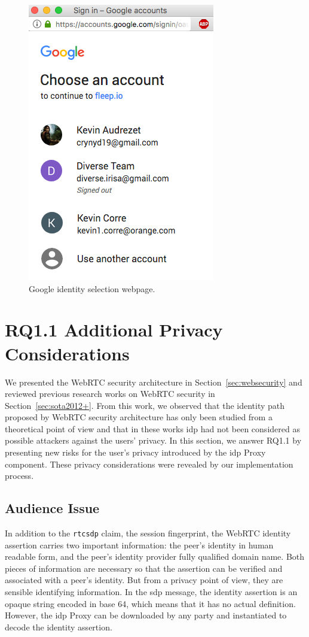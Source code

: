 \begin{figure}[h]
\includegraphics[width=1.3\marginparwidth]{images/googleIdSelector}
\caption[Google Identity Selection Page]{Google identity selection webpage.}
\label{fig:googleIdSelector}
\end{figure}

\section{RQ1.1 Additional Privacy Considerations}
\label{sec:privacyissue}

We presented the WebRTC security architecture in Section~\ref{sec:websecurity} and reviewed previous research works on WebRTC security in Section~\ref{sec:sota2012+}.
From this work, we observed that the identity path proposed by WebRTC security architecture has only been studied from a theoretical point of view and that in these works \gls{idp} had not been considered as possible attackers against the users' privacy.
In this section, we answer RQ1.1 by presenting new risks for the user's privacy introduced by the \gls{idp} Proxy component.
These privacy considerations were revealed by our implementation process.

\subsection{Audience Issue}
In addition to the \texttt{rtcsdp} claim, \ie the session fingerprint, the WebRTC identity assertion carries two important information: the peer's identity in human readable form, and the peer's identity provider fully qualified domain name.
Both pieces of information are necessary so that the assertion can be verified and associated with a peer's identity.
But from a privacy point of view, they are sensible identifying information.
In the \gls{sdp} message, the identity assertion is an opaque string encoded in base 64, which means that it has no actual definition.
However, the \gls{idp} Proxy can be downloaded by any party and instantiated to decode the identity assertion.

